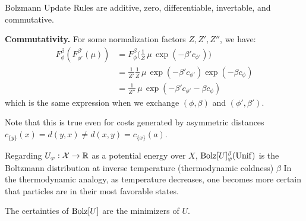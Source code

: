 \documentclass{article}
\newcommand{\Unif}{\mathrm{Unif}}
\begin{document}
\begin{prop}
	Bolzmann Update Rules are additive, zero, differentiable, invertable, and commutative.
\end{prop}

\begin{lproof}
	\textbf{Commutativity.}
	For some normalization factors $Z, Z', Z''$, we have:
	\begin{align*}
		 F^\beta_\phi( F^{\beta'}_{\phi'}(\mu))
		 &= F^\beta_\phi \Big( \frac{1}{Z} \,\mu\, \exp(- \beta' c_{\phi'}) \Big) \\
		 &= \frac{1}{Z'} \frac{1}{Z} \,\mu\, \exp(- \beta' c_{\phi'}) \exp(- \beta c_{\phi}) \\
		 &= \frac{1}{Z''} \,\mu\, \exp(-\beta' c_{\phi'} - \beta c_\phi)
	\end{align*}
	which is the same expression when we exchange $(\phi, \beta)$ and $(\phi', \beta')$.
\end{lproof}

Note that this is true even for costs generated by asymmetric distances $c_{\{y\}}(x) = d(y, x) \ne d(x,y) = c_{\{x\}}(a)$.


\begin{remark}
	Regarding $U_\varphi : \mathcal X \to \mathbb R$ as a potential energy over $X$,
	$\Bolz U^\beta_\varphi(\Unif)$ is the Boltzmann distribution at inverse temperature (thermodynamic coldness) $\beta$
	In the thermodynamic analogy, as temperature decreases, one becomes more certain that particles are in their most favorable states.
\end{remark}


The certainties of $\mathrm{Bolz}[U]$ are the minimizers of $U$.
\end{document}
